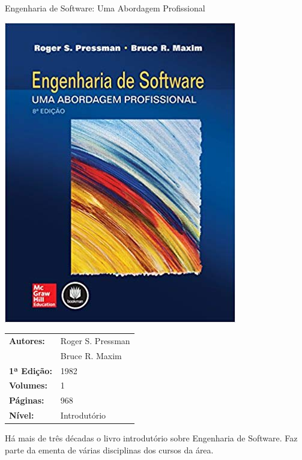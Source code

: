 \begin{frame}[fragile]{Engenharia de Software: Uma Abordagem Profissional}

    \begin{minipage}{0.4\textwidth}
        \includegraphics[scale=0.25]{pressman.jpg}
    \end{minipage}
    \begin{minipage}{0.5\textwidth}
        \begin{small}
            \begin{tabularx}{0.95\textwidth}{lX}
                \textbf{Autores:} & Roger S. Pressman \\
                & Bruce R. Maxim \\
                \textbf{1ª Edição:} & 1982 \\
                \textbf{Volumes:} & 1 \\
                \textbf{Páginas:} & 968 \\
                \textbf{Nível:} & Introdutório \\
            \end{tabularx}
        \end{small}
    \end{minipage}

    \vspace{0.2in} 

    Há mais de três décadas o livro introdutório sobre Engenharia de Software. Faz parte da
    ementa de várias disciplinas dos cursos da área.
\end{frame}

